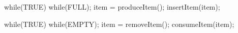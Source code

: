 \documentclass[varwidth=30em,crop]{standalone}
\begin{document}
\begin{minipage}{.46\linewidth}
\vspace{1em}
\begin{ccode}
while(TRUE){
    while(FULL);
    item = produceItem();
    insertItem(item);
}
\end{ccode}
\end{minipage}\qquad
\begin{minipage}{.45\linewidth}
\vspace{1em}
\begin{ccode}
while(TRUE){
    while(EMPTY);
    item = removeItem();
    consumeItem(item);
}
\end{ccode}  
\end{minipage}
\end{document}
